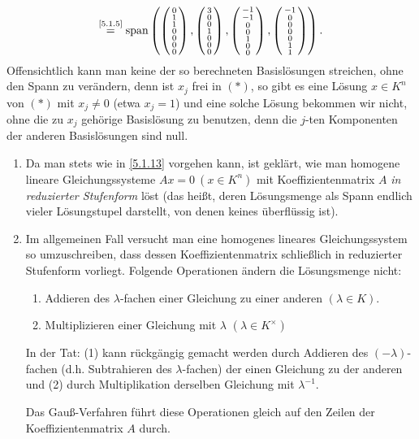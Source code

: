 \documentclass[../../main.tex]{subfiles}
\begin{document}
\begin{bsp}
\begin{multline*}
\overset{\text{\ref{5.1.5}}}{=}\operatorname{span}\left(\left(\begin{smallmatrix}0\\1\\1\\0\\0\\0\\0\end{smallmatrix}\right),\left(\begin{smallmatrix}3\\0\\0\\1\\0\\0\\0\end{smallmatrix}\right),\left(\begin{smallmatrix}-1\\-1\\0\\0\\1\\0\\0\end{smallmatrix}\right),\left(\begin{smallmatrix}-1\\0\\0\\0\\0\\1\\1\end{smallmatrix}\right)\right).
\end{multline*}
Offensichtlich kann man keine der so berechneten Basislösungen streichen, ohne den Spann zu verändern, denn ist $x_j$ frei in $(*)$, so gibt es eine Lösung $x\in K^n$ von $(*)$ mit $x_j\ne0$ (etwa $x_j=1$) und eine solche Lösung bekommen wir nicht,
ohne die zu $x_j$ gehörige Basislösung zu benutzen, denn die $j$-ten Komponenten der anderen Basislösungen sind null.
\end{bsp}

\begin{bem}\label{5.1.14}
\begin{enumerate}[\normalfont(a)]
\item Da man stets wie in \ref{5.1.13} vorgehen kann, ist geklärt, wie man homogene lineare Gleichungssysteme $Ax=0~(x\in K^n)$ mit Koeffizientenmatrix $A$ \emph{in reduzierter Stufenform} löst (das heißt, deren Lösungsmenge als Spann endlich vieler Lösungstupel darstellt, von denen keines überflüssig ist).
\item Im allgemeinen Fall versucht man eine homogenes lineares Gleichungssystem so umzuschreiben, dass dessen Koeffizientenmatrix schließlich in reduzierter Stufenform vorliegt. Folgende Operationen ändern die Lösungsmenge nicht:
\begin{enumerate}[(1)]
\item  Addieren des $\lambda$-fachen einer Gleichung zu einer anderen $(\lambda\in K)$.
\item Multiplizieren einer Gleichung mit $\lambda$ $(\lambda\in K^\times)$
\end{enumerate}
In der Tat: (1) kann rückgängig gemacht werden durch Addieren des $(-\lambda)$-fachen (d.h. Subtrahieren des $\lambda$-fachen) der einen Gleichung zu der anderen und (2) durch Multiplikation derselben Gleichung mit $\lambda^{-1}$.

Das Gauß-Verfahren führt diese Operationen gleich auf den Zeilen der Koeffizientenmatrix $A$ durch.
\end{enumerate}
\end{bem}
\end{document}
